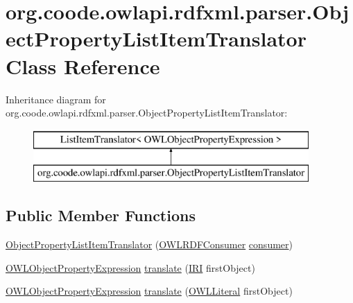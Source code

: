 \hypertarget{classorg_1_1coode_1_1owlapi_1_1rdfxml_1_1parser_1_1_object_property_list_item_translator}{\section{org.\-coode.\-owlapi.\-rdfxml.\-parser.\-Object\-Property\-List\-Item\-Translator Class Reference}
\label{classorg_1_1coode_1_1owlapi_1_1rdfxml_1_1parser_1_1_object_property_list_item_translator}
}
Inheritance diagram for org.\-coode.\-owlapi.\-rdfxml.\-parser.\-Object\-Property\-List\-Item\-Translator\-:\begin{figure}[H]
\begin{center}
\leavevmode
\includegraphics[height=2.000000cm]{classorg_1_1coode_1_1owlapi_1_1rdfxml_1_1parser_1_1_object_property_list_item_translator}
\end{center}
\end{figure}
\subsection*{Public Member Functions}
\begin{DoxyCompactItemize}
\item 
\hyperlink{classorg_1_1coode_1_1owlapi_1_1rdfxml_1_1parser_1_1_object_property_list_item_translator_a8a190c0cea38ff9a1e3c992fed020d6c}{Object\-Property\-List\-Item\-Translator} (\hyperlink{classorg_1_1coode_1_1owlapi_1_1rdfxml_1_1parser_1_1_o_w_l_r_d_f_consumer}{O\-W\-L\-R\-D\-F\-Consumer} \hyperlink{classorg_1_1coode_1_1owlapi_1_1rdfxml_1_1parser_1_1_object_property_list_item_translator_ab47844593c9a744bfc455132597d866f}{consumer})
\item 
\hyperlink{interfaceorg_1_1semanticweb_1_1owlapi_1_1model_1_1_o_w_l_object_property_expression}{O\-W\-L\-Object\-Property\-Expression} \hyperlink{classorg_1_1coode_1_1owlapi_1_1rdfxml_1_1parser_1_1_object_property_list_item_translator_a23a41ad380ca6ef9869fc5ce2a3cadaf}{translate} (\hyperlink{classorg_1_1semanticweb_1_1owlapi_1_1model_1_1_i_r_i}{I\-R\-I} first\-Object)
\item 
\hyperlink{interfaceorg_1_1semanticweb_1_1owlapi_1_1model_1_1_o_w_l_object_property_expression}{O\-W\-L\-Object\-Property\-Expression} \hyperlink{classorg_1_1coode_1_1owlapi_1_1rdfxml_1_1parser_1_1_object_property_list_item_translator_a00035f989f1e9737ead6b91c9c25fc96}{translate} (\hyperlink{interfaceorg_1_1semanticweb_1_1owlapi_1_1model_1_1_o_w_l_literal}{O\-W\-L\-Literal} first\-Object)
\end{DoxyCompactItemize}
